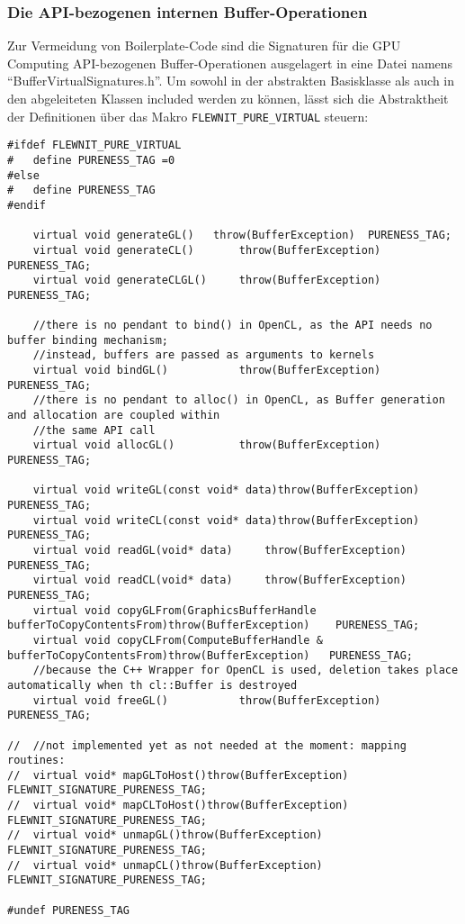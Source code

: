 	\subsubsection{Die API-bezogenen internen Buffer-Operationen}
	Zur Vermeidung von Boilerplate-Code sind die Signaturen für die GPU Computing API-bezogenen 
	Buffer-Operationen ausgelagert in eine Datei namens "`BufferVirtualSignatures.h"'.
	Um sowohl in der abstrakten Basisklasse als auch in den abgeleiteten Klassen included werden zu können,
	lässt sich die Abstraktheit der Definitionen über das Makro \lstinline|FLEWNIT_PURE_VIRTUAL| steuern:
		
	\begin{lstlisting}[caption={API- und Buffertyp-abhängige Operationen auf Buffern -- Definitionen},
					   label=listing:bufferOpDefs]	
#ifdef FLEWNIT_PURE_VIRTUAL
#	define PURENESS_TAG =0
#else
#	define PURENESS_TAG
#endif

	virtual void generateGL()	throw(BufferException)	PURENESS_TAG;
	virtual void generateCL()		throw(BufferException)	PURENESS_TAG;
	virtual void generateCLGL()		throw(BufferException)	PURENESS_TAG;

	//there is no pendant to bind() in OpenCL, as the API needs no buffer binding mechanism;
	//instead, buffers are passed as arguments to kernels
	virtual void bindGL()			throw(BufferException)	PURENESS_TAG;
	//there is no pendant to alloc() in OpenCL, as Buffer generation and allocation are coupled within
	//the same API call
	virtual void allocGL()			throw(BufferException)	PURENESS_TAG;

	virtual void writeGL(const void* data)throw(BufferException)	PURENESS_TAG;
	virtual void writeCL(const void* data)throw(BufferException)	PURENESS_TAG;
	virtual void readGL(void* data)		throw(BufferException)	PURENESS_TAG;
	virtual void readCL(void* data)		throw(BufferException)	PURENESS_TAG;
	virtual void copyGLFrom(GraphicsBufferHandle bufferToCopyContentsFrom)throw(BufferException)	PURENESS_TAG;
	virtual void copyCLFrom(ComputeBufferHandle & bufferToCopyContentsFrom)throw(BufferException)	PURENESS_TAG;
	//because the C++ Wrapper for OpenCL is used, deletion takes place automatically when th cl::Buffer is destroyed
	virtual void freeGL()			throw(BufferException)	PURENESS_TAG;
	
//	//not implemented yet as not needed at the moment: mapping routines:
//	virtual void* mapGLToHost()throw(BufferException)	FLEWNIT_SIGNATURE_PURENESS_TAG;
//	virtual void* mapCLToHost()throw(BufferException)	FLEWNIT_SIGNATURE_PURENESS_TAG;
//	virtual void* unmapGL()throw(BufferException)	FLEWNIT_SIGNATURE_PURENESS_TAG;
//	virtual void* unmapCL()throw(BufferException)	FLEWNIT_SIGNATURE_PURENESS_TAG;

#undef PURENESS_TAG
	\end{lstlisting}
	
